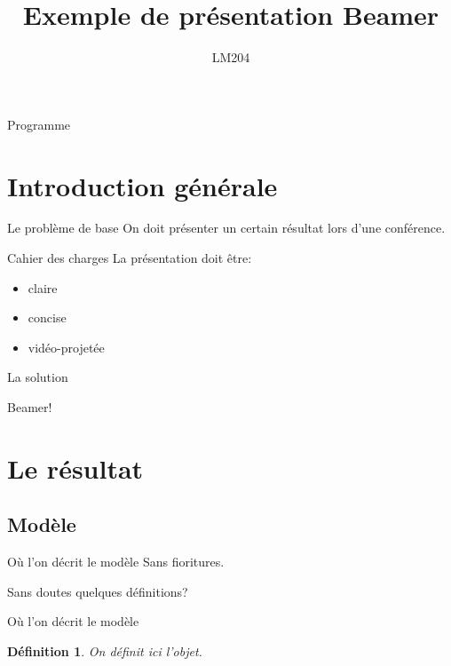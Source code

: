\documentclass{beamer}
\title{Exemple de présentation Beamer}
\author{LM204}
\newtheorem{defi}{Définition}
\begin{document}
\frame{\titlepage}

\setcounter{tocdepth}{1}
\begin{frame}{Programme}
 \tableofcontents[pausesections]
\end{frame}

\section{Introduction générale}

\begin{frame}{Le problème de base}
  On doit présenter un certain résultat lors d'une conférence.
  \pause
  \begin{block}{Cahier des charges}
    La présentation doit \^etre:
   \begin{itemize}
    \item claire
    \item concise
    \item vidéo-projetée
   \end{itemize}
  \end{block}
\end{frame}

\begin{frame}{La solution}
  \pause
  \begin{center}
   \Huge Beamer!
  \end{center}
\end{frame}

\section{Le résultat}

\begin{frame}
 \tableofcontents[currentsection]
\end{frame}

\subsection{Modèle}

\begin{frame}{Où l'on décrit le modèle}
 Sans fioritures.
 \pause
 
 Sans doutes quelques définitions?
\end{frame}

\begin{frame}{Où l'on décrit le modèle}
 \begin{defi}
  On définit ici l'objet.
 \end{defi}
\end{frame}
\end{document}
